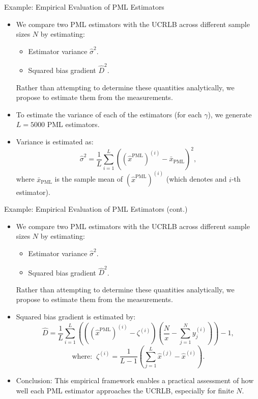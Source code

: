 \documentclass{beamer}
\begin{document}
\begin{frame}{Example: Empirical Evaluation of PML Estimators}

\begin{itemize}
    \item We compare two PML estimators with the UCRLB across different sample sizes $N$ by estimating:
    \begin{itemize}
        \item Estimator variance $\hat{\sigma}^2$.
        \item Squared bias gradient $\hat{D}^2$.
    \end{itemize}
    Rather than attempting to determine these quantities analytically, we propose to estimate them from the measurements.

    \item To estimate the variance of each of the estimators (for each $\gamma$), we generate $L = 5000$ PML estimators.  
    
    \item Variance is estimated as:
    \[
        \hat{\sigma}^2 = \frac{1}{L} \sum_{i=1}^{L} \left((\hat{x}^{\text{PML}})^{(i)} - \bar{x}_{\text{PML}} \right)^2, 
    \]
    where $\bar{x}_{\text{PML}}$ is the sample mean of $(\hat{x}^{\text{PML}})^{(i)}$ (which denotes and $i$-th estimator).
\end{itemize}

\end{frame}

\begin{frame}{Example: Empirical Evaluation of PML Estimators (cont.)}

\begin{itemize}
    \item We compare two PML estimators with the UCRLB across different sample sizes $N$ by estimating:
    \begin{itemize}
        \item Estimator variance $\hat{\sigma}^2$.
        \item Squared bias gradient $\hat{D}^2$.
    \end{itemize}
    Rather than attempting to determine these quantities analytically, we propose to estimate them from the measurements. 

    \item Squared bias gradient is estimated by:
    \[
        \hat{D} = \frac{1}{L} \sum_{i=1}^{L} \left( \left((\hat{x}^{\text{PML}})^{(i)} - \zeta^{(i)}\right) \left( \frac{N}{x} - \sum_{j=1}^{N} y_j^{(i)} \right) \right) - 1,
    \]
    \[
    \text{where: } \ \zeta^{(i)} = \frac{1}{L-1} \left( \sum_{j=1}^{L} \hat{x}^{(j)} - \hat{x}^{(i)} \right).
    \]

    \item Conclusion: This empirical framework enables a practical assessment of how well each PML estimator approaches the UCRLB, especially for finite \( N \).
\end{itemize}

\end{frame}
\end{document}
